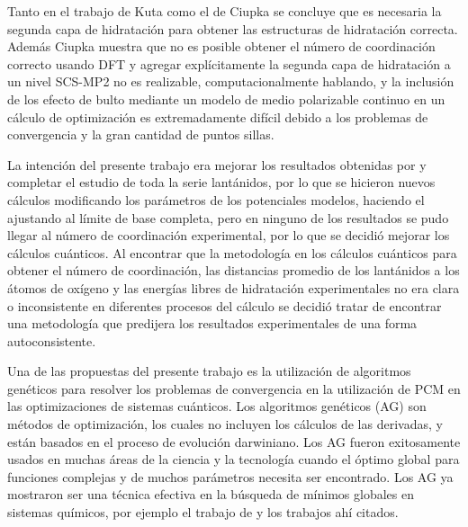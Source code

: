 Tanto en el trabajo de Kuta como el de Ciupka se concluye que es 
necesaria la segunda capa de hidrataci\'on para obtener las 
estructuras de hidrataci\'on correcta. Adem\'as Ciupka muestra que no
es posible obtener el n\'umero de coordinaci\'on correcto usando DFT
y agregar expl\'icitamente la segunda capa de hidrataci\'on a un 
nivel SCS-MP2 no es realizable, computacionalmente hablando, 
y la inclusi\'on de los efecto de bulto mediante un modelo de medio
polarizable continuo en un c\'alculo de optimizaci\'on es 
extremadamente dif\'icil debido a los problemas de convergencia y la 
gran cantidad de puntos sillas.

La intenci\'on del presente trabajo era mejorar los resultados
obtenidas por \cite{Vill2009} y completar el estudio de toda la 
serie lant\'anidos, por lo que se hicieron nuevos c\'alculos 
modificando los par\'ametros de los potenciales modelos, haciendo el 
ajustando al l\'imite de base completa, pero en ninguno de los 
resultados se pudo llegar al n\'umero de coordinaci\'on experimental,
por lo que se decidi\'o mejorar los c\'alculos cu\'anticos. Al 
encontrar que la metodolog\'ia en los c\'alculos cu\'anticos para 
obtener el n\'umero de coordinaci\'on, las distancias promedio de los
lant\'anidos a los \'atomos de ox\'igeno y las energ\'ias libres de 
hidrataci\'on experimentales no era clara o inconsistente en 
diferentes procesos del c\'alculo se decidi\'o tratar de encontrar 
una metodolog\'ia que predijera los resultados experimentales de una
forma autoconsistente.

Una de las propuestas del presente trabajo es la utilizaci\'on de
algoritmos gen\'eticos para resolver los problemas de convergencia en
la utilizaci\'on de PCM en las optimizaciones de sistemas cu\'anticos.
Los algoritmos gen\'eticos (AG) son m\'etodos de optimizaci\'on, los 
cuales no incluyen los c\'alculos de las derivadas, y est\'an basados
en el proceso de evoluci\'on darwiniano. Los AG fueron exitosamente
usados en muchas \'areas de la ciencia y la tecnolog\'ia cuando el 
\'optimo global para funciones complejas y de muchos par\'ametros 
necesita ser encontrado. Los AG ya mostraron ser una t\'ecnica 
efectiva en la b\'usqueda de m\'inimos globales en sistemas
qu\'imicos, por ejemplo el trabajo de \cite{Alex2005} y los trabajos
ah\'i citados.

